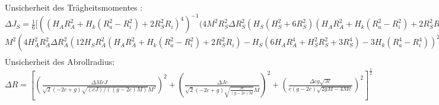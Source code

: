 \subsection*{}
Unsicherheit des Trägheitsmomentes :\\
$\Delta J_S= \frac{1}{6} [ ((H_{A} R_{A}^{2} + H_{k} (R_{a}^{2} - R_{i}^{2}) + 2 R_{S}^{2} R_{i})^{4})^{-1} (4 M^{2} R_{S}^{2} \Delta R_{S}^{2} (H_{S} (H_{S}^{2} + 6 R_{S}^{2}) (H_{A} R_{A}^{2} + H_{k} (R_{a}^{2} - R_{i}^{2}) + 2 R_{S}^{2} R_{i}) - 2 R_{i} (H_{S} (6 H_{A} R_{A}^{4} + H_{S}^{2} R_{S}^{2} + 3 R_{S}^{4}) + 3 H_{k} (R_{a}^{4} - R_{i}^{4})))^{2} +$\\
$M^{2} (4 H_{A}^{2} R_{A}^{2} \Delta R_{A}^{2} (12 H_{S} R_{A}^{2} (H_{A} R_{A}^{2} + H_{k} (R_{a}^{2} - R_{i}^{2}) + 2 R_{S}^{2} R_{i}) - H_{S} (6 H_{A} R_{A}^{4} + H_{S}^{2} R_{S}^{2} + 3 R_{S}^{4}) - 3 H_{k} (R_{a}^{4} - R_{i}^{4}))^{2} + 4 H_{k}^{2} R_{a}^{2} \Delta R_{a}^{2} (- H_{S} (6 H_{A} R_{A}^{4} + H_{S}^{2} R_{S}^{2} + 3 R_{S}^{4}) - 3 H_{k} (R_{a}^{4} - R_{i}^{4}) + 6 R_{a}^{2} (H_{A} R_{A}^{2} + H_{k} (R_{a}^{2} - R_{i}^{2}) + 2 R_{S}^{2} R_{i}))^{2} + R_{A}^{4} \Delta H_{A}^{2} (6 H_{S} R_{A}^{2} (H_{A} R_{A}^{2} + H_{k} (R_{a}^{2} - R_{i}^{2}) + 2 R_{S}^{2} R_{i}) - H_{S}  (6 H_{A} R_{A}^{4} + H_{S}^{2} R_{S}^{2} + 3 R_{S}^{4} ) - 3 H_{k}  (R_{a}^{4} - R_{i}^{4} ) )^{2} + \Delta H_{k}^{2}  ( (R_{a}^{2} - R_{i}^{2} )  (H_{S}  (6 H_{A} R_{A}^{4} + H_{S}^{2} R_{S}^{2} + 3 R_{S}^{4} ) + 3 H_{k}  (R_{a}^{4} - R_{i}^{4} ) ) - 3  (R_{a}^{4} - R_{i}^{4} )  (H_{A} R_{A}^{2} + H_{k}  (R_{a}^{2} - R_{i}^{2} ) + 2 R_{S}^{2} R_{i} ) )^{2} + \Delta R_{i}^{2}  (12.0 H_{k} R_{i}^{3}  (H_{A} R_{A}^{2} + H_{k}  (R_{a}^{2} - R_{i}^{2} ) + 2 R_{S}^{2} R_{i} ) - 2  (H_{S}  (6 H_{A} R_{A}^{4} + H_{S}^{2} R_{S}^{2} + 3 R_{S}^{4} ) + 3 H_{k}  (R_{a}^{4} - R_{i}^{4} ) )  (H_{k} R_{i} - R_{S}^{2} ) )^{2} ) +  (9 M^{2} \Delta H_{S}^{2}  (2 H_{A} R_{A}^{4} + H_{S}^{2} R_{S}^{2} + R_{S}^{4} )^{2} + \Delta M^{2}  (H_{S}  (6 H_{A} R_{A}^{4} + H_{S}^{2} R_{S}^{2} + 3 R_{S}^{4} ) + 3 H_{k}  (R_{a}^{4} - R_{i}^{4} ) )^{2} )  (H_{A} R_{A}^{2} + H_{k}  (R_{a}^{2} - R_{i}^{2} ) + 2 R_{S}^{2} R_{i} )^{2} )  ]^{\frac{1}{2}} $
\begin{align}
\label{eq:uJfall}
\end{align}
Unsicherheit des Abrollradius:\\
$
\Delta R =\left[ 
(\frac{\Delta M c J}{\sqrt{2} (-2 c+g) \sqrt{(c J)/((g-2c) M)} M^2})^2
+(\frac{\Delta J c}{\sqrt{2} (-2 c+g) \sqrt{\frac{J c}{(g-2c) M}} M})^2
+(\frac{\Delta c g \sqrt{J c}}{ c (g-2 c)\sqrt{2 g M-4 M c}})^2 
\right]^{\frac{1}{2}}	
$
\begin{align}
	\label{eq:uR}
\end{align}







